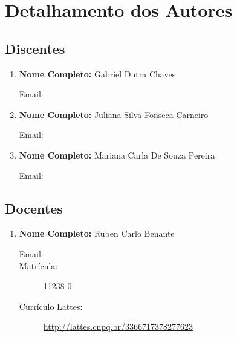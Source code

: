 \documentclass[a4paper,12pt]{article} %
\begin{document}
\section*{Detalhamento dos Autores}

\subsection*{Discentes}

\begin{enumerate}
    \item \textbf{Nome Completo:} Gabriel Dutra Chaves
    \begin{description}
        \item [Email:] 
    \end{description}

    \item \textbf{Nome Completo:} Juliana Silva Fonseca Carneiro
    \begin{description}
        \item [Email:] 
    \end{description}

    \item \textbf{Nome Completo:} Mariana Carla De Souza Pereira
    \begin{description}
        \item [Email:] 
    \end{description}

\end{enumerate}


\subsection*{Docentes}

\begin{enumerate}
    \item \textbf{Nome Completo:} Ruben Carlo Benante
    \begin{description}
        \item [Email:] 
        \item [Matrícula:] 11238-0
        \item [Currículo Lattes:] \url{http://lattes.cnpq.br/3366717378277623}
    \end{description}
\end{enumerate}
\end{document}
